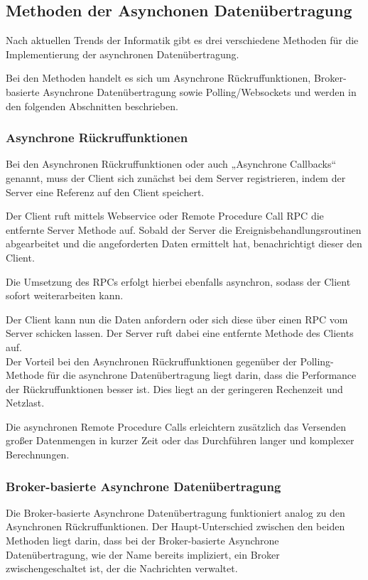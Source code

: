 \subsection{Methoden der Asynchonen Datenübertragung}
Nach aktuellen Trends der Informatik gibt es drei verschiedene Methoden für die Implementierung der asynchronen Datenübertragung. 

Bei den Methoden handelt es sich um Asynchrone Rückruffunktionen, Broker-basierte Asynchrone Datenübertragung sowie Polling/Websockets und werden in den folgenden Abschnitten beschrieben. 

\subsubsection{Asynchrone Rückruffunktionen}
Bei den Asynchronen Rückruffunktionen oder auch „Asynchrone Callbacks“ genannt, muss der Client sich zunächst bei dem Server registrieren, indem der Server eine Referenz auf den Client speichert. \cite{abts:2019}

Der Client ruft mittels Webservice oder Remote Procedure Call \ac{RPC} die entfernte Server Methode auf. Sobald der Server die Ereignisbehandlungsroutinen abgearbeitet und die angeforderten Daten ermittelt hat, benachrichtigt dieser den Client. \cite*{bengelbaun:2015}

Die Umsetzung des RPCs erfolgt hierbei ebenfalls asynchron, sodass der Client sofort weiterarbeiten kann. \cite*{schill:2012}

Der Client kann nun die Daten anfordern oder sich diese über einen RPC vom Server schicken lassen. Der Server ruft dabei eine entfernte Methode des Clients auf. \cite*{abts:2019,schill:2012}  \\

Der Vorteil bei den Asynchronen Rückruffunktionen gegenüber der Polling-Methode für die asynchrone Datenübertragung liegt darin, dass die Performance der Rückruffunktionen besser ist. Dies liegt an der geringeren Rechenzeit und Netzlast. \cite*{abts:2019}

Die asynchronen Remote Procedure Calls erleichtern zusätzlich das Versenden großer Datenmengen in kurzer Zeit oder das Durchführen langer und komplexer Berechnungen. \cite*{schill:2012}

\subsubsection{Broker-basierte Asynchrone Datenübertragung}
Die Broker-basierte Asynchrone Datenübertragung funktioniert analog zu den Asynchronen Rückruffunktionen. Der Haupt-Unterschied zwischen den beiden Methoden liegt darin, dass bei der Broker-basierte Asynchrone Datenübertragung, wie der Name bereits impliziert, ein Broker zwischengeschaltet ist, der die Nachrichten verwaltet. 

